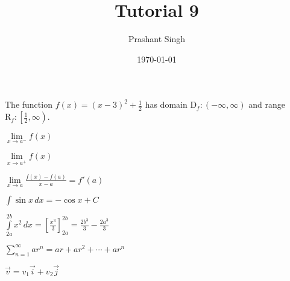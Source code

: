 \documentclass[12pt]{article}
\begin{document}
	\title{Tutorial 9}
	\author{Prashant Singh}
	\date{\today}
The function $f(x) = (x-3)^2 + \frac{1}{2}$ has domain  $\mathrm{D}_f:(-\infty, \infty)$ and range $\mathrm{R}_f:\left[\frac{1}{2}, \infty \right)$.

$\lim \limits_{x \to a^-} f(x)$

$\lim \limits_{x \to a^+} f(x)$

$\displaystyle{\lim \limits_{x \to a}\frac{f(x) -f(a)}{x - a} = f'(a)}$

$\displaystyle{\int \sin x \, dx = - \cos x + C}$

$\displaystyle{\int \limits_{2a}^{2b} x^2 \, dx = \left[\frac{x^3}{3} \right]_{2a}^{2b} = \frac{{2b}^3}{3}} - \frac{{2a}^3}{3}$

$\displaystyle{\sum \limits_{n=1}^{\infty} ar^n = ar + ar^2 + \cdots + ar^n}$

$\vec{v} = v_1 \vec{i} + v_2 \vec{j}$
\end{document}
